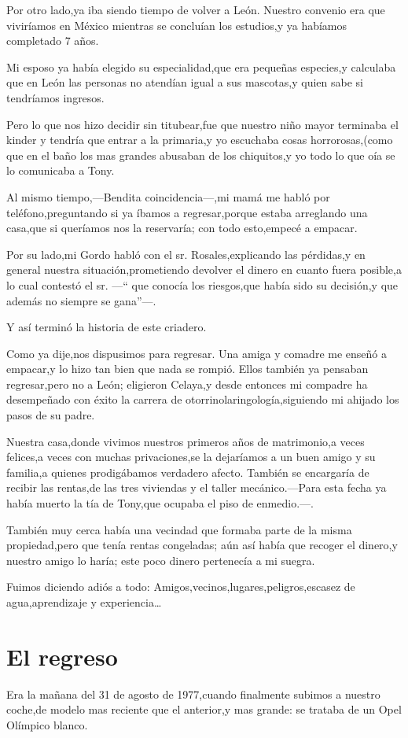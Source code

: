 \documentclass[letterpaper,12pt]{book}
\begin{document}
Por otro lado,ya iba siendo tiempo de volver a León. Nuestro convenio era que viviríamos en México mientras se concluían los estudios,y ya habíamos completado 7 años.

Mi esposo ya había elegido su especialidad,que era pequeñas especies,y calculaba que en León las personas no atendían igual a sus mascotas,y quien sabe si tendríamos ingresos.

Pero lo que nos hizo decidir sin titubear,fue que nuestro niño mayor terminaba el kinder y tendría que entrar a la primaria,y yo escuchaba cosas horrorosas,(como que en el baño los mas grandes abusaban de los chiquitos,y yo todo lo que oía se lo comunicaba a Tony.

Al mismo tiempo,---Bendita coincidencia---,mi mamá me habló por teléfono,preguntando si ya íbamos a regresar,porque estaba arreglando una casa,que si queríamos nos la reservaría; con todo esto,empecé a empacar.

Por su lado,mi Gordo habló con el sr. Rosales,explicando las pérdidas,y en general nuestra situación,prometiendo devolver el dinero en cuanto fuera posible,a lo cual contestó el sr. ---`` que conocía los riesgos,que había  sido su decisión,y que además no siempre se gana''---.

Y así terminó la historia de este criadero.

Como ya dije,nos dispusimos para regresar. Una amiga y comadre me enseñó a empacar,y lo hizo tan bien que nada se rompió. Ellos también ya pensaban regresar,pero no a León; eligieron Celaya,y desde entonces mi compadre ha desempeñado con éxito la carrera de otorrinolaringología,siguiendo mi ahijado los pasos de su padre.

Nuestra casa,donde vivimos nuestros primeros años de matrimonio,a veces felices,a veces con muchas privaciones,se la dejaríamos a un buen amigo y su familia,a quienes prodigábamos verdadero afecto. También se encargaría de recibir las rentas,de las tres viviendas y el taller mecánico.---Para esta fecha ya había muerto la tía de Tony,que ocupaba el piso de enmedio.---.

También muy cerca había una vecindad que formaba parte de la misma propiedad,pero que tenía rentas congeladas; aún así había que recoger el dinero,y nuestro amigo lo haría; este poco dinero pertenecía a mi suegra.

Fuimos diciendo adiós a todo: Amigos,vecinos,lugares,peligros,escasez de agua,aprendizaje y experiencia\ldots
\chapter{El regreso}
Era la mañana del 31 de agosto de 1977,cuando finalmente subimos a nuestro coche,de modelo mas reciente que el anterior,y mas grande: se trataba de un Opel Olímpico blanco.
\end{document}
